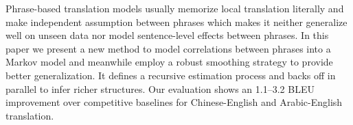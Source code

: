 Phrase-based translation models usually memorize local translation literally and make independent assumption between phrases which makes it neither generalize well on unseen data nor model sentence-level effects between phrases. In this paper we present a new method to model correlations between phrases into a Markov model and meanwhile employ a robust smoothing strategy to provide better generalization. It defines a recursive estimation process and backs off in parallel to infer richer structures. Our evaluation shows an 1.1--3.2 BLEU improvement over competitive baselines for Chinese-English and Arabic-English translation.
